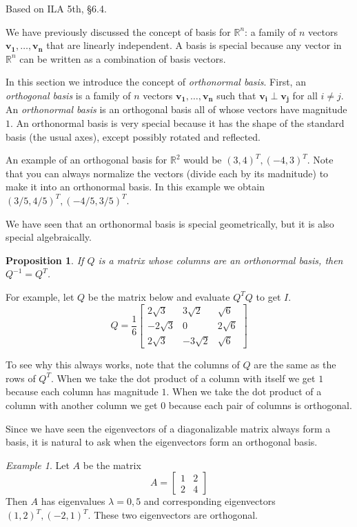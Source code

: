 \documentclass[11pt,oneside]{amsbook}
\newcommand{\R}{\mathbb R}
\theoremstyle{definition}
\theoremstyle{plain}
\newtheorem{proposition}[theorem]{Proposition}
\theoremstyle{definition}
\theoremstyle{remark}
\newtheorem{example}[theorem]{Example}
\numberwithin{equation}{section}
\numberwithin{figure}{section}
\begin{document}
Based on ILA 5th, \S 6.4.

We have previously discussed the concept of basis for $\R^n$: a family of $n$ vectors $\mathbf{v_1},\ldots,\mathbf{v_n}$ that are linearly independent. A basis is special because any vector in $\R^n$ can be written as a combination of basis vectors.

In this section we introduce the concept of \emph{orthonormal basis}. First, an \emph{orthogonal basis} is a family of $n$ vectors $\mathbf{v_1},\ldots,\mathbf{v_n}$ such that $\mathbf{v_i}\perp\mathbf{v_j}$ for all $i\neq j$. An \emph{orthonormal basis} is an orthogonal basis all of whose vectors have magnitude $1$. An orthonormal basis is very special because it has the shape of the standard basis (the usual axes), except possibly rotated and reflected.

An example of an orthogonal basis for $\R^2$ would be $(3,4)^T,(-4,3)^T$. Note that you can always normalize the vectors (divide each by its madnitude) to make it into an orthonormal basis. In this example we obtain $(3/5,4/5)^T,(-4/5,3/5)^T$.

We have seen that an orthonormal basis is special geometrically, but it is also special algebraically.

\begin{proposition}
  If $Q$ is a matrix whose columns are an orthonormal basis, then $Q^{-1}=Q^T$.
\end{proposition}

For example, let $Q$ be the matrix below and evaluate $Q^TQ$ to get $I$.
\[Q=\frac16\begin{bmatrix}
  2\sqrt{3}&3\sqrt{2}&\sqrt{6}\\
  -2\sqrt{3}&0&2\sqrt{6}\\
  2\sqrt{3}&-3\sqrt{2}&\sqrt{6}
\end{bmatrix}
\]

To see why this always works, note that the columns of $Q$ are the same as the rows of $Q^T$. When we take the dot product of a column with itself we get $1$ because each column has magnitude $1$. When we take the dot product of a column with another column we get $0$ because each pair of columns is orthogonal.

Since we have seen the eigenvectors of a diagonalizable matrix always form a basis, it is natural to ask when the eigenvectors form an orthogonal basis.

\begin{example}
  Let $A$ be the matrix
  \[A=\begin{bmatrix}1&2\\2&4\end{bmatrix}
  \]
  Then $A$ has eigenvalues $\lambda=0,5$ and corresponding eigenvectors $(1,2)^T,(-2,1)^T$. These two eigenvectors are orthogonal.
\end{example}
\end{document}

